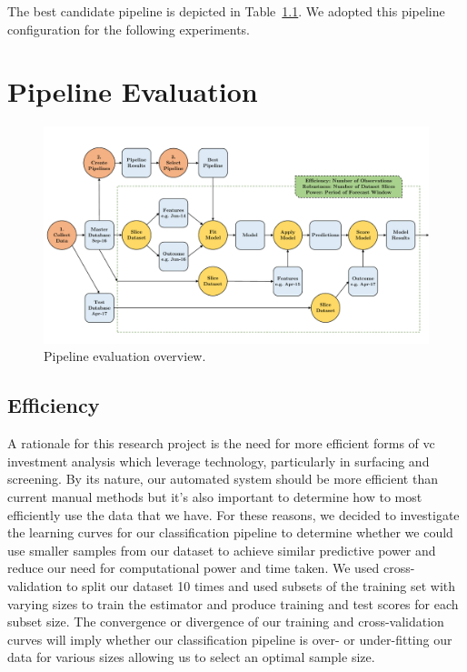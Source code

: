\documentclass[../thesis/thesis.tex]{subfiles}
\begin{document}


The best candidate pipeline is depicted in Table~\ref{}. We adopted this pipeline configuration for the following experiments.


\section{Pipeline Evaluation}


\begin{figure}[!htb]
    \centering
    \includegraphics[width=\textwidth]{../figures/design/pipeline_evaluation}
    \caption{Pipeline evaluation overview.}
    \label{fig:design:pipeline_evaluation}
\end{figure}

\subsection{Efficiency}

A rationale for this research project is the need for more efficient forms of \gls{vc} investment analysis which leverage technology, particularly in surfacing and screening. By its nature, our automated system should be more efficient than current manual methods but it's also important to determine how to most efficiently use the data that we have. For these reasons, we decided to investigate the learning curves for our classification pipeline to determine whether we could use smaller samples from our dataset to achieve similar predictive power and reduce our need for computational power and time taken. We used cross-validation to split our dataset 10 times and used subsets of the training set with varying sizes to train the estimator and produce training and test scores for each subset size. The convergence or divergence of our training and cross-validation curves will imply whether our classification pipeline is over- or under-fitting our data for various sizes allowing us to select an optimal sample size.
\end{document}
